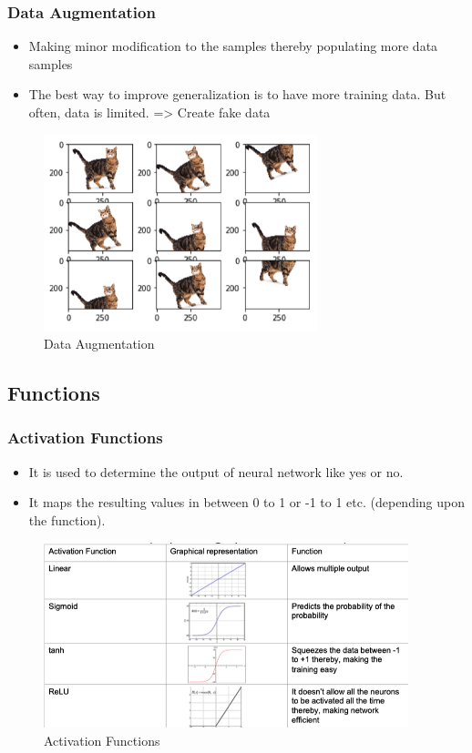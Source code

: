 \documentclass{tron}
\begin{document}
\subsubsection{Data Augmentation}
\begin{itemize}
	\item Making minor modification to the samples thereby populating more data samples
	\item The best way to improve generalization is to have more training data. But often, data is limited. => Create fake data
\end{itemize}
\begin{figure}[H]
	\center
	\includegraphics[width=300px]{Figs/CNN/augm}
	\caption{Data Augmentation}
\end{figure}


\newpage
\subsection{Functions}
\subsubsection{Activation Functions}
\begin{itemize}
	\item It is used to determine the output of neural network like yes or no. 
	\item It maps the resulting values in between 0 to 1 or -1 to 1 etc. (depending upon the function).
\end{itemize}
\begin{figure}[H]
	\center
	\includegraphics[width=400px]{Figs/CNN/activation}
	\caption{Activation Functions}
\end{figure}
\end{document}
